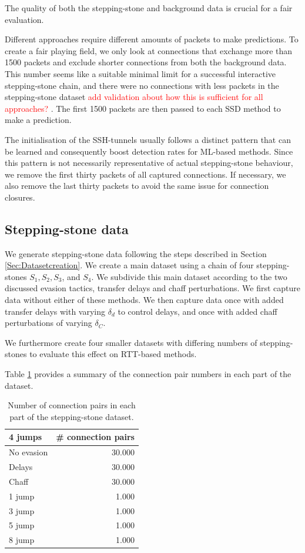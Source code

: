 \documentclass[runningheads]{llncs}\usepackage[]{graphicx}\usepackage[]{color}
\begin{document}
The quality of both the stepping-stone and background data is crucial for a fair evaluation.

Different approaches require different amounts of packets to make predictions. To create a fair playing field, we only look at connections that exchange more than 1500 packets and exclude shorter connections from both the background data. This number seems like a suitable minimal limit for a successful interactive stepping-stone chain, and there were no connections with less packets in the stepping-stone dataset \textcolor{red}{add validation about how this is sufficient for all approaches?}
. The first 1500 packets are then passed to each SSD method to make a prediction.

The initialisation of the SSH-tunnels usually follows a distinct pattern that can be learned and consequently boost detection rates for ML-based methods. Since this pattern is not necessarily representative of actual stepping-stone behaviour, we remove the first thirty packets of all captured connections. If necessary, we also remove the last thirty packets to avoid the same issue for connection closures. 

\subsection{Stepping-stone data}

We generate stepping-stone data following the steps described in Section \ref{Sec:Datasetcreation}. We create a main dataset using a chain of four stepping-stones $S_1, S_2, S_3$, and $S_4$. We subdivide this main dataset according to the two discussed evasion tactics, transfer delays and chaff perturbations. We first capture data without either of these methods. We then capture data once with added transfer delays with varying $\delta_d$ to control delays, and once with added chaff perturbations of varying $\delta_C$. %

We furthermore create four smaller datasets with differing numbers of stepping-stones to evaluate this effect on RTT-based methods.

Table \ref{Tab:MalData} provides a summary of the connection pair numbers in each part of the dataset.
\begin{table}
\centering
\begin{tabular}{l|r}
4 jumps&\# connection pairs \\ \hline
No evasion& 30.000\\ \hline
Delays& 30.000 \\ \hline
Chaff&30.000 \\ \hline
\hline
1 jump& 1.000\\ \hline
3 jump& 1.000 \\ \hline
5 jump& 1.000 \\ \hline
8 jump& 1.000 \\ \hline
\end{tabular}
\caption{Number of connection pairs in each part of the stepping-stone dataset.}\label{Tab:MalData}
\end{table}
\end{document}
